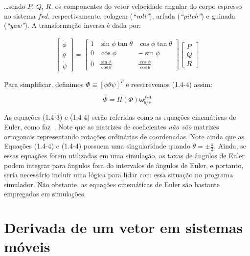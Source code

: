 \ldots sendo \(P\), \(Q\), \(R\), os componentes do vetor velocidade angular do corpo espresso no sistema \(frd\), respectivamente, rolagem (\emph{``roll''}), arfada (\emph{``pitch''}) e guinada (\emph{``yaw''}). A transformação inversa é dada por:

\begin{align} \tag{1.4-4}
    \begin{bmatrix}
        \dot\phi \\
        \dot\theta \\
        \dot\psi
    \end{bmatrix}
    =
    \begin{bmatrix}
        1 & \sin{\phi}\tan{\theta} & \cos{\phi}\tan{\theta} \\
        0 & \cos{\phi} & -\sin{\phi} \\
        0 & \frac{\sin{\phi}}{\cos{\theta}} & \frac{\cos{\phi}}{\cos{\theta}}
    \end{bmatrix}
    \begin{bmatrix}
        P \\ Q \\ R
    \end{bmatrix}
\end{align}

Para simplificar, definimos \(\Phi \equiv \left[\phi \theta \psi \right]^T \) e reescrevemos  (1.4-4) assim:

\begin{equation} \tag{1.4-5}
    \Phi = H \left( \Phi \right) \mathbf{\omega}^{frd}_{b/r}
\end{equation}

As equações (1.4-3) e (1.4-4) serão referidas como as equações cinemáticas de Euler, como faz~\cite{Stevens2016}. Note que as matrizes de coeficientes \emph{não são} matrizes ortogonais representando rotações ordinárias de coordenadas. Note ainda que as Equações (1.4-4) e (1.4-4) possuem uma singularidade quando  \(\theta = \pm \frac{\pi}{2}\). Ainda, se essas equações forem utilizadas em uma simulação, as taxas de ângulos de Euler podem integrar para ângulos fora do intervalos de ângulos de Euler, e portanto, seria necessário incluir uma lógica para lidar com essa situação no programa simulador. Não obstante, as equações cinemáticas de Euler são bastante empregadas em simulações.

\section{Derivada de um vetor em sistemas móveis}

